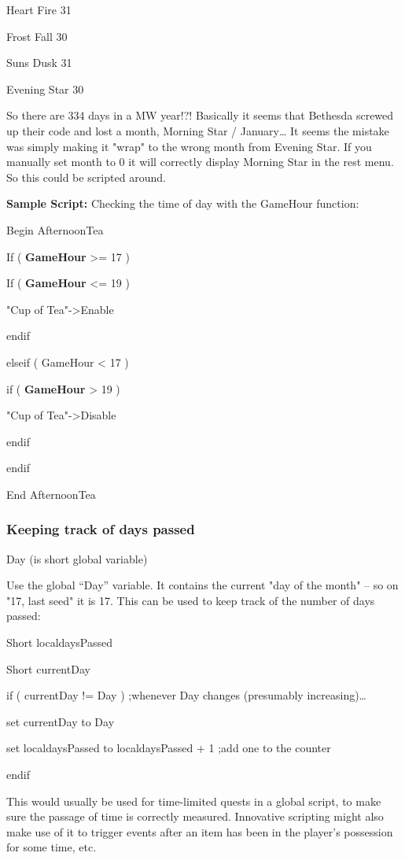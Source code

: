 \documentclass[
]{article}
\begin{document}
Heart Fire 31

Frost Fall 30

Suns Dusk 31

Evening Star 30

So there are 334 days in a MW year!?! Basically it seems that Bethesda
screwed up their code and lost a month, Morning Star / January\ldots{}
It seems the mistake was simply making it "wrap" to the wrong month from
Evening Star. If you manually set month to 0 it will correctly display
Morning Star in the rest menu. So this could be scripted around.

\textbf{Sample Script:} Checking the time of day with the GameHour
function:

Begin AfternoonTea

If ( \textbf{GameHour} \textgreater= 17 )

If ( \textbf{GameHour} \textless= 19 )

"Cup of Tea"-\textgreater Enable

endif

elseif ( GameHour \textless{} 17 )

if ( \textbf{GameHour} \textgreater{} 19 )

"Cup of Tea"-\textgreater Disable

endif

endif

End AfternoonTea

\hypertarget{keeping-track-of-days-passed}{%
\subsubsection{Keeping track of days
passed}\label{keeping-track-of-days-passed}}

Day (is short global variable)

Use the global ``Day'' variable. It contains the current "day of the
month" -- so on "17, last seed" it is 17. This can be used to keep track
of the number of days passed:

Short localdaysPassed

Short currentDay

if ( currentDay != Day ) ;whenever Day changes (presumably
increasing)\ldots{}

set currentDay to Day

set localdaysPassed to localdaysPassed + 1 ;add one to the counter

endif

This would usually be used for time-limited quests in a global script,
to make sure the passage of time is correctly measured. Innovative
scripting might also make use of it to trigger events after an item has
been in the player's possession for some time, etc.
\end{document}

